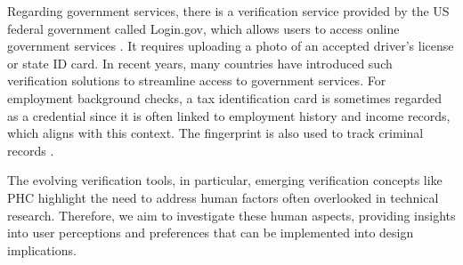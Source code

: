 Regarding government services, there is a verification service provided by the US federal government called Login.gov, which allows users to access online government services \cite{LogingovVerify, shovon2018restful}. It requires uploading a photo of an accepted driver’s license or state ID card. In recent years, many countries have introduced such verification solutions to streamline access to government services. %
For employment background checks, a tax identification card is sometimes regarded as a credential since it is often linked to employment history and income records, which aligns with this context. The fingerprint is also used to track criminal records \cite{cole2009suspect}. 

The evolving verification tools, in particular, emerging verification concepts like PHC highlight the need to address human factors often overlooked in technical research. Therefore, we aim to investigate these human aspects, providing insights into user perceptions and preferences that can be implemented into design implications.



